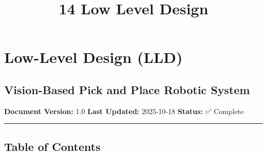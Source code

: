 \documentclass[
]{article}
\title{14 Low Level Design}
\author{}
\date{}
\begin{document}
\maketitle

{
\setcounter{tocdepth}{3}
\tableofcontents
}
\hypertarget{low-level-design-lld}{%
\section{Low-Level Design (LLD)}\label{low-level-design-lld}}

\hypertarget{vision-based-pick-and-place-robotic-system}{%
\subsection{Vision-Based Pick and Place Robotic
System}\label{vision-based-pick-and-place-robotic-system}}

\textbf{Document Version:} 1.0 \textbf{Last Updated:} 2025-10-18
\textbf{Status:} ✅ Complete

\begin{center}\rule{0.5\linewidth}{0.5pt}\end{center}

\hypertarget{table-of-contents}{%
\subsection{Table of Contents}\label{table-of-contents}}
\end{document}
